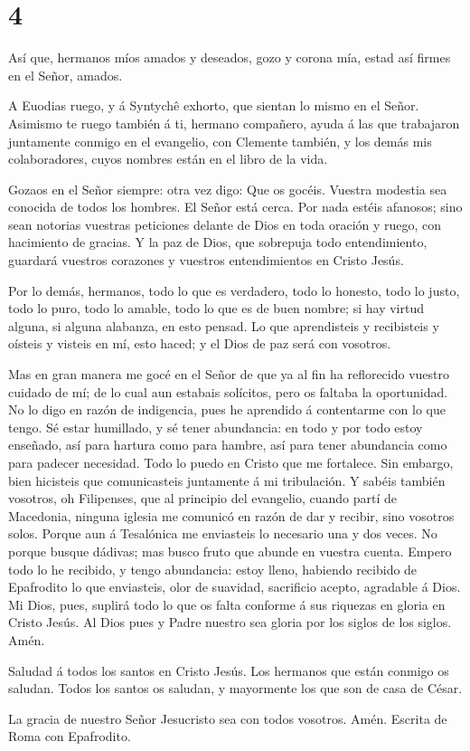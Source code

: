 \hypertarget{section-3}{%
\section{4}\label{section-3}}

 Así que, hermanos míos amados y deseados, gozo y corona
mía, estad así firmes en el Señor, amados.

 A Euodias ruego, y á Syntychê exhorto, que sientan lo mismo
en el Señor.  Asimismo te ruego también á ti, hermano
compañero, ayuda á las que trabajaron juntamente conmigo en el
evangelio, con Clemente también, y los demás mis colaboradores, cuyos
nombres están en el libro de la vida.

 Gozaos en el Señor siempre: otra vez digo: Que os gocéis.
 Vuestra modestia sea conocida de todos los hombres. El
Señor está cerca.  Por nada estéis afanosos; sino sean
notorias vuestras peticiones delante de Dios en toda oración y ruego,
con hacimiento de gracias.  Y la paz de Dios, que sobrepuja
todo entendimiento, guardará vuestros corazones y vuestros
entendimientos en Cristo Jesús.

 Por lo demás, hermanos, todo lo que es verdadero, todo lo
honesto, todo lo justo, todo lo puro, todo lo amable, todo lo que es de
buen nombre; si hay virtud alguna, si alguna alabanza, en esto pensad.
 Lo que aprendisteis y recibisteis y oísteis y visteis en
mí, esto haced; y el Dios de paz será con vosotros.

 Mas en gran manera me gocé en el Señor de que ya al fin ha
reflorecido vuestro cuidado de mí; de lo cual aun estabais solícitos,
pero os faltaba la oportunidad.  No lo digo en razón de
indigencia, pues he aprendido á contentarme con lo que tengo.
 Sé estar humillado, y sé tener abundancia: en todo y por
todo estoy enseñado, así para hartura como para hambre, así para tener
abundancia como para padecer necesidad.  Todo lo puedo en
Cristo que me fortalece.  Sin embargo, bien hicisteis que
comunicasteis juntamente á mi tribulación.  Y sabéis
también vosotros, oh Filipenses, que al principio del evangelio, cuando
partí de Macedonia, ninguna iglesia me comunicó en razón de dar y
recibir, sino vosotros solos.  Porque aun á Tesalónica me
enviasteis lo necesario una y dos veces.  No porque busque
dádivas; mas busco fruto que abunde en vuestra cuenta. 
Empero todo lo he recibido, y tengo abundancia: estoy lleno, habiendo
recibido de Epafrodito lo que enviasteis, olor de suavidad, sacrificio
acepto, agradable á Dios.  Mi Dios, pues, suplirá todo lo
que os falta conforme á sus riquezas en gloria en Cristo Jesús.
 Al Dios pues y Padre nuestro sea gloria por los siglos de
los siglos. Amén.

 Saludad á todos los santos en Cristo Jesús. Los hermanos
que están conmigo os saludan.  Todos los santos os saludan,
y mayormente los que son de casa de César.

 La gracia de nuestro Señor Jesucristo sea con todos
vosotros. Amén. Escrita de Roma con Epafrodito.

